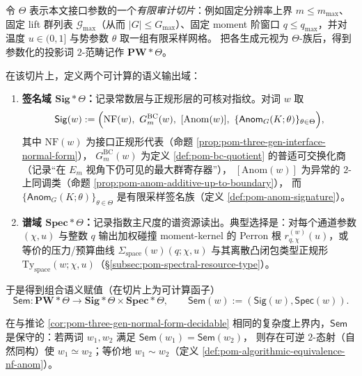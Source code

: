 \begin{definition}\label{def:pom-conservative-sem-functor}
令 \(\Theta\) 表示本文接口参数的一个\emph{有限审计切片}：例如固定分辨率上界 \(m\le m_{\max}\)、固定 lift 群列表 \(\mathcal{G}_{\max}\)（从而 \(|G|\le G_{\max}\)）、固定 moment 阶窗口 \(q\le q_{\max}\)，并对温度 \(u\in(0,1]\) 与势参数 \(\theta\) 取一组有限采样网格。
把各生成元视为 \(\Theta\)-族后，得到参数化的投影词 \(2\)-范畴记作 \(\mathbf{PW}*\Theta\)。
\par
在该切片上，定义两个可计算的语义输出域：
\begin{enumerate}
  \item \textbf{签名域 \(\mathbf{Sig}*\Theta\)：}记录常数层与正规形层的可核对指纹。对词 \(w\) 取
  \[
  \mathsf{Sig}(w):=\Bigl(\mathrm{NF}(w),\ G^{\mathrm{BC}}_m(w),\ [\mathrm{Anom}(w)],\ \{\mathsf{Anom}_{G}(K;\theta)\}_{\theta\in\Theta}\Bigr),
  \]
  其中 \(\mathrm{NF}(w)\) 为接口正规形代表（命题 \ref{prop:pom-three-gen-interface-normal-form}），
  \(G^{\mathrm{BC}}_m(w)\) 为定义 \ref{def:pom-bc-quotient} 的普适可交换化商（记录“在 \(E_m\) 视角下仍可见的最大群寄存器”），
  \([\mathrm{Anom}(w)]\) 为异常的 \(2\)-上同调类（命题 \ref{prop:pom-anom-additive-up-to-boundary}），
  而 \(\{\mathsf{Anom}_{G}(K;\theta)\}_{\theta\in\Theta}\) 是有限采样签名族（定义 \ref{def:pom-anom-signature}）。
  \item \textbf{谱域 \(\mathbf{Spec}*\Theta\)：}记录指数主尺度的谱资源读出。典型选择是：对每个通道参数 \((\chi,u)\) 与整数 \(q\) 输出加权碰撞 moment-kernel 的 Perron 根
  \(r^{(w)}_{q,\chi}(u)\)，或等价的压力/预算曲线 \(\Sigma_{\mathrm{space}}(w)(q;\chi,u)\) 与其离散凸闭包类型正规形 \(\mathrm{Ty}_{\mathrm{space}}(w;\chi,u)\)（\S\ref{subsec:pom-spectral-resource-type}）。
\end{enumerate}
于是得到组合语义赋值（在切片上为可计算函子）
\[
\boxed{\;
\mathsf{Sem}:\mathbf{PW}*\Theta\longrightarrow \mathbf{Sig}*\Theta\times \mathbf{Spec}*\Theta,\qquad
\mathsf{Sem}(w):=(\mathsf{Sig}(w),\mathsf{Spec}(w)).\;}
\]
\end{definition}

\begin{theorem}\label{thm:pom-sem-conservative-on-slice}
在与推论 \ref{cor:pom-three-gen-normal-form-decidable} 相同的复杂度上界内，\(\mathsf{Sem}\) 是保守的：若两词 \(w_1,w_2\) 满足
\(
\mathsf{Sem}(w_1)=\mathsf{Sem}(w_2)
\)，
则存在可逆 \(2\)-态射（自然同构）使 \(w_1\simeq w_2\)；等价地 \(w_1\sim w_2\)（定义 \ref{def:pom-algorithmic-equivalence-nf-anom}）。
\end{theorem}

